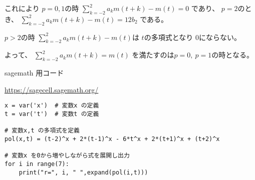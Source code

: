 \documentclass[12pt,b5paper]{ltjsarticle}
\begin{document}
\begin{enumerate}
      これにより
      $p=0,1$の時
      $\sum_{k=-2}^{2}a_{k}m(t+k)-m(t) =0$
      であり、
      $p=2$のとき、
      $\sum_{k=-2}^{2}a_{k}m(t+k)-m(t) =12b_{2}$
      である。

      $p>2$の時
      $\sum_{k=-2}^{2}a_{k}m(t+k)-m(t)$は
      $t$の多項式となり
      $0$にならない。

      よって、
      $\sum_{k=-2}^{2}a_{k}m(t+k)=m(t)$
      を満たすのは$p=0,\ p=1$の時となる。

\hrulefill



\end{enumerate}

sagemath 用コード

\url{https://sagecell.sagemath.org/}
\begin{lstlisting}
x = var('x')  # 変数x の定義
t = var('t')  # 変数t の定義

# 変数x,t の多項式を定義
pol(x,t) = (t-2)^x + 2*(t-1)^x - 6*t^x + 2*(t+1)^x + (t+2)^x

# 変数x を0から増やしながら式を展開し出力
for i in range(7):
    print("r=", i, " ",expand(pol(i,t)))
\end{lstlisting}
\end{document}

